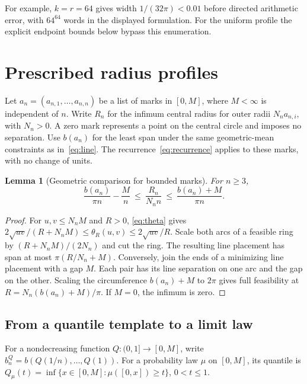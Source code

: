 \documentclass[11pt,letterpaper]{article}
\newtheorem{lemma}[theorem]{Lemma}
\theoremstyle{definition}\newtheorem{definition}[theorem]{Definition}
\theoremstyle{remark}\newtheorem{remark}[theorem]{Remark}
\begin{document}
For example, $k=r=64$ gives width $1/(32\pi)<0.01$ before directed
arithmetic error, with $64^{64}$ words in the displayed formulation.
For the uniform profile the explicit endpoint bounds below bypass this enumeration.

\section{Prescribed radius profiles}\label{sec:profiles}

Let $a_n=(a_{n,1},\ldots,a_{n,n})$ be a list of marks in $[0,M]$,
where $M<\infty$ is independent of $n$. Write $R_n$ for the infimum
central radius for outer radii $N_n a_{n,i}$, with $N_n>0$. A zero mark
represents a point on the central circle and imposes no separation.
Use $b(a_n)$ for the least span under the same geometric-mean constraints
as in~\eqref{eq:line}. The recurrence~\eqref{eq:recurrence} applies to
these marks, with no change of units.

\begin{lemma}[Geometric comparison for bounded marks]\label{lem:profile-squeeze}
For $n\ge3$,
\begin{equation}\label{eq:profile-squeeze}
 \frac{b(a_n)}{\pi n}-\frac{M}{n}
 \ \le\ \frac{R_n}{N_n n}\ \le\ \frac{b(a_n)+M}{\pi n}.
\end{equation}
\end{lemma}
\begin{proof}
For $u,v\le N_nM$ and $R>0$, \eqref{eq:theta} gives
$2\sqrt{uv}/(R+N_nM)\le\theta_R(u,v)\le2\sqrt{uv}/R$.
Scale both arcs of a feasible ring by $(R+N_nM)/(2N_n)$ and cut
the ring. The resulting line placement has span at most $\pi(R/N_n+M)$.
Conversely, join the ends of a minimizing line placement with a gap $M$.
Each pair has its line separation on one arc and the gap on the other.
Scaling the circumference $b(a_n)+M$ to $2\pi$ gives full feasibility
at $R=N_n(b(a_n)+M)/\pi$. If $M=0$, the infimum is zero.
\end{proof}

\subsection{From a quantile template to a limit law}

For a nondecreasing function $Q:(0,1]\to[0,M]$, write
$b_n^Q=b(Q(1/n),\ldots,Q(1))$. For a probability law $\mu$ on $[0,M]$,
its quantile is $Q_\mu(t)=\inf\{x\in[0,M]:\mu([0,x])\ge t\}$,
$0<t\le1$.
\end{document}
